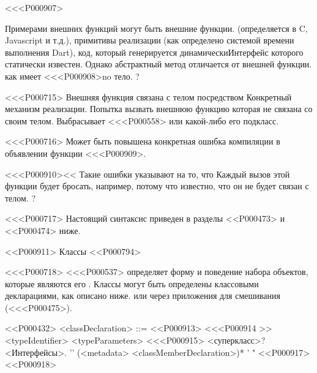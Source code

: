 {{{{<<<P000907>{%
Примерами внешних функций могут быть внешние функции.
(определяется в C, Javascript и т.д.),
примитивы реализации (как определено системой времени выполнения Dart),
код, который генерируется динамическиИнтерфейс которого статически известен.
Однако абстрактный метод отличается от внешней функции.
как имеет <<<P000908>{no} тело.%
?

<<<P000715>%
Внешняя функция связана с телом посредством
Конкретный механизм реализации.
Попытка вызвать внешнюю функцию
которая не связана со своим телом.
Выбрасывает <<<P000558> или какой-либо его подкласс.

<<<P000716>%
Может быть повышена конкретная ошибка компиляции
в объявлении функции <<<P000909>{}.

<<<P000910><<%
Такие ошибки указывают на то, что
Каждый вызов этой функции будет бросать, например,
потому что известно, что он не будет связан с телом.
?

<<<P000717>%
Настоящий синтаксис приведен в
разделы <<P000473> и <<P000474> ниже.


<<P000911> Классы
<<P000794>

<<<P000718>%
<<<P000537> определяет форму и поведение набора объектов, которые являются его
.
Классы могут быть определены классовыми декларациями, как описано ниже.
или через приложения для смешивания (<<<P000475>).

<<P000432>
<classDeclaration> ::=
<<P000913> <<<P000914 >> <typeIdentifier> <typeParameters>
<<<P000915>{} <суперкласс>? <Интерфейсы>.
\gnewline{} '{' (<metadata> <classMemberDeclaration>)* '} "
<<P000917> <<P000918> }}}}}

